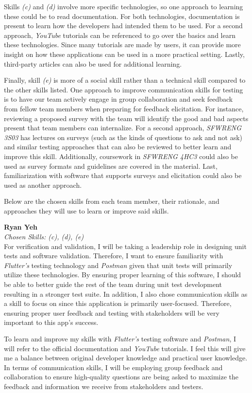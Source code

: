 \documentclass[12pt, titlepage]{article}
\begin{document}
\begin{enumerate}
  Skills \textit{(c)} and \textit{(d)} involve more specific technologies, so one approach to learning these
  could be to read documentation. For both technologies, documentation is present to learn how the
  developers had intended them to be used. For a second approach, \textit{YouTube} tutorials can be referenced to
  go over the basics and learn these technologies. Since many tutorials are made by users, it
  can provide more insight on how these applications can be used in a more practical setting.
  Lastly, third-party articles can also be used for additional learning. \par

  Finally, skill \textit{(e)} is more of a social skill rather than a technical skill compared to the other skills listed.
  One approach to improve communication skills for testing is to have our team actively engage in group collaboration and seek feedback from fellow team members when preparing for feedback elicitation. For instance, reviewing a proposed survey with the team will identify the good and bad aspects present that team members can internalize. For a second approach, \textit{SFWRENG 3S03} has lectures on surveys
  (such as the kinds of questions to ask and not ask) and similar testing approaches that can also be reviewed to better
  learn and improve this skill. Additionally, coursework in \textit{SFWRENG 4HC3} could also be used as survey formats and guidelines
  are covered in the material. Last, familiarization with software that supports surveys and elicitation could also be used as
  another approach.

  Below are the chosen skills from each team member, their rationale, and approaches they will use to learn or
  improve said skills.

  \textbf{Ryan Yeh}\\
  \textit{Chosen Skills: (c), (d), (e)} \\
  For verification and validation, I will be taking a leadership role in designing unit tests and software
  validation. Therefore, I want to ensure familiarity with \textit{Flutter's} testing technology and \textit{Postman}
  given that unit tests will primarily utilize these technologies. By ensuring proper learning of
  this software, I should be able to better guide the rest of the team during unit test development resulting
  in a stronger test suite. In addition, I also chose communication skills as a skill to focus on since this application
  is primarily user-focused. Therefore, ensuring proper user feedback and testing with stakeholders will be very important
  to this app's success. \par
  To learn and improve my skills with \textit{Flutter's} testing software and \textit{Postman}, I will refer to the
  official documentation and \textit{YouTube} tutorials. I feel this will give me a balance between original developer
  knowledge and practical user knowledge. In terms of communication skills, I will be employing group feedback
  and collaboration to ensure high-quality questions are being asked to maximize the feedback and information we receive
  from stakeholders and testers.


\end{enumerate}
\end{document}
